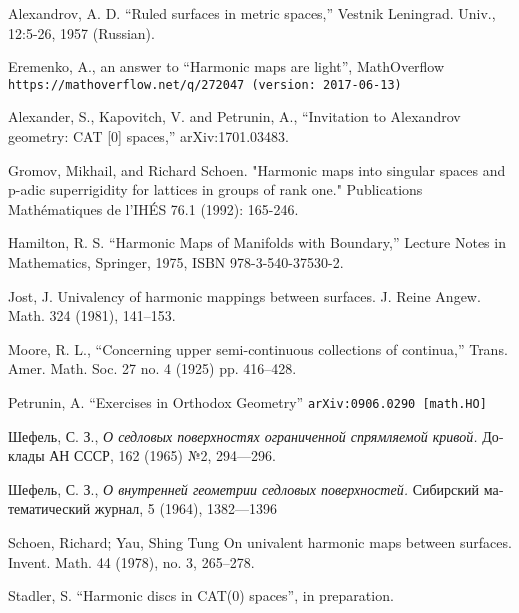 \documentclass{article}
\begin{document}
\begin{thebibliography}{52}

 Alexandrov, A. D. ``Ruled  surfaces  in  metric  spaces,'' Vestnik Leningrad. Univ., 12:5-26, 1957 (Russian).

 Eremenko, A.,  
an answer to ``Harmonic maps are light'', MathOverflow
\texttt{https://mathoverflow.net/q/272047 (version: 2017-06-13)}

Alexander, S., Kapovitch, V. and Petrunin, A.,
``Invitation to Alexandrov geometry: CAT [0] spaces,''
arXiv:1701.03483.

 Gromov, Mikhail, and Richard Schoen. "Harmonic maps into singular spaces and p-adic superrigidity for lattices in groups of rank one." Publications Mathématiques de l'IHÉS 76.1 (1992): 165-246.

 Hamilton, R. S. ``Harmonic Maps of Manifolds with Boundary,'' Lecture Notes in Mathematics, Springer, 1975, ISBN 978-3-540-37530-2.

 Jost, J.
Univalency of harmonic mappings between surfaces.
J. Reine Angew. Math. 324 (1981), 141--153. 

Moore, R. L.,
``Concerning upper semi-continuous collections of continua,''
Trans. Amer. Math. Soc. 27 no. 4 (1925) pp. 416--428.

 Petrunin, A. 
``Exercises in Orthodox Geometry''
{\tt arXiv:0906.0290 [math.HO]}

\begin{otherlanguage}{russian}
Шефель, С. З.,
\textit{О седловых поверхностях ограниченной спрямляемой кривой.}
Доклады АН СССР, 162 (1965) №2, 
294---296.
\end{otherlanguage}

\begin{otherlanguage}{russian}
Шефель, С. З., 
\textit{О внутренней геометрии седловых поверхностей.}
Сибирский математический журнал, 5 (1964), 1382---1396
\end{otherlanguage}

 Schoen, Richard; Yau, Shing Tung
On univalent harmonic maps between surfaces.
Invent. Math. 44 (1978), no. 3, 265--278. 

 Stadler, S. ``Harmonic discs in CAT(0) spaces'', in preparation.



\end{thebibliography}
\end{document}
